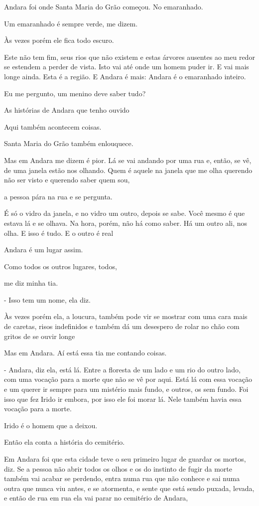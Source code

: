 Andara foi onde Santa Maria do Grão começou. No emaranhado.

Um emaranhado é sempre verde, me dizem.

Às vezes porém ele fica todo escuro.

Este não tem fim, seus rios que não existem e estas árvores ausentes ao
meu redor se estendem a perder de vista. Isto vai até onde um homem
puder ir. E vai mais longe ainda. Esta é a região. E Andara é mais:
Andara é o emaranhado inteiro.

Eu me pergunto, um menino deve saber tudo?

As histórias de Andara que tenho ouvido

Aqui também acontecem coisas.

Santa Maria do Grão também enlouquece.

Mas em Andara me dizem é pior. Lá se vai andando por uma rua e, então,
se vê, de uma janela estão nos olhando. Quem é aquele na janela que me
olha querendo não ser visto e querendo saber quem sou,

a pessoa pára na rua e se pergunta.

É só o vidro da janela, e no vidro um outro, depois se sabe. Você mesmo
é que estava lá e se olhava. Na hora, porém, não há como saber. Há um
outro ali, nos olha. E isso é tudo. E o outro é real

Andara é um lugar assim.

Como todos os outros lugares, todos,

me diz minha tia.

- Isso tem um nome, ela diz.

Às vezes porém ela, a loucura, também pode vir se mostrar com uma cara
mais de caretas, risos indefinidos e também dá um desespero de rolar no
chão com gritos de se ouvir longe

Mas em Andara. Aí está essa tia me contando coisas.

- Andara, diz ela, está lá. Entre a floresta de um lado e um rio do
outro lado, com uma vocação para a morte que não se vê por aqui. Está lá
com essa vocação e um querer ir sempre para um mistério mais fundo, e
outros, os sem fundo. Foi isso que fez Irido ir embora, por isso ele foi
morar lá. Nele também havia essa vocação para a morte.

Irido é o homem que a deixou.

Então ela conta a história do cemitério.

Em Andara foi que esta cidade teve o seu primeiro lugar de guardar os
mortos, diz. Se a pessoa não abrir todos os olhos e os do instinto de
fugir da morte também vai acabar se perdendo, entra numa rua que não
conhece e sai numa outra que nunca viu antes, e se atormenta, e sente
que está sendo puxada, levada, e então de rua em rua ela vai parar no
cemitério de Andara,

